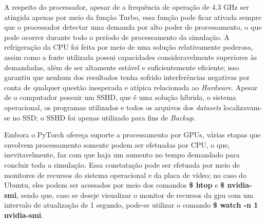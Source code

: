 A respeito do processador, apesar de a frequência de operação de 4.3 GHz ser atingida apenas por meio da função Turbo, essa função pode ficar ativada sempre que o processador detectar uma demanda por alto poder de processamento, o que pode ocorrer durante todo o período de processamento da simulação. A refrigeração da CPU foi feita por meio de uma solução relativamente poderosa, assim como a fonte utilizada possui capacidades consideravelmente superiores às demandadas, além de ser altamente estável e suficientemente eficiente; isso garantiu que nenhum dos resultados tenha sofrido interferências negativas por conta de qualquer questão inesperada e atípica relacionada ao \textit{Hardware}. Apesar de o computador possuir um SSHD, que é uma solução híbrida, o sistema operacional, os programas utilizados e todos os arquivos dos \textit{datasets} localizavam-se no SSD; o SSHD foi apenas utilizado para fins de \textit{Backup}.

Embora o PyTorch ofereça suporte a processamento por GPUs, várias etapas que envolvem processamento somente podem ser efetuadas por CPU, o que, inevitavelmente, faz com que haja um aumento no tempo demandado para concluir toda a simulação. Essa constatação pode ser efetuada por meio de monitores de recursos do sistema operacional e da placa de vídeo; no caso do Ubuntu, eles podem ser acessados por meio dos comandos \textbf{\$ htop} e \textbf{\$ nvidia-smi}, sendo que, caso se deseje visualizar o monitor de recursos da gpu com um intervalo de atualização de 1 segundo, pode-se utilizar o comando \textbf{\$ watch -n 1 nvidia-smi}.




